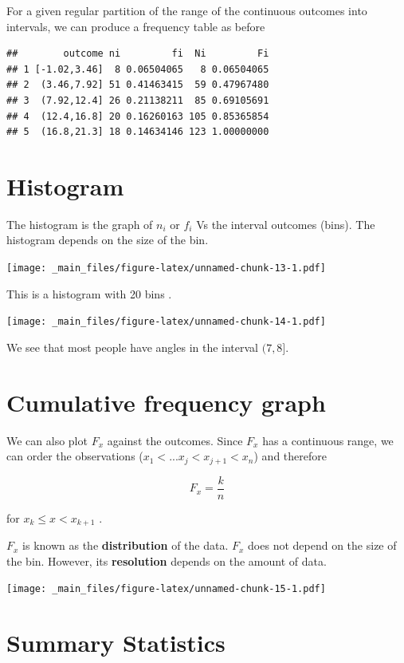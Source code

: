 \documentclass[
]{book}
\begin{document}
For a given regular partition of the range of the continuous outcomes into intervals, we can produce a frequency table as before

\begin{verbatim}
##        outcome ni         fi  Ni         Fi
## 1 [-1.02,3.46]  8 0.06504065   8 0.06504065
## 2  (3.46,7.92] 51 0.41463415  59 0.47967480
## 3  (7.92,12.4] 26 0.21138211  85 0.69105691
## 4  (12.4,16.8] 20 0.16260163 105 0.85365854
## 5  (16.8,21.3] 18 0.14634146 123 1.00000000
\end{verbatim}

\hypertarget{histogram}{%
\section{Histogram}\label{histogram}}

The histogram is the graph of \(n_i\) or \(f_i\) Vs the interval outcomes (bins). The histogram depends on the size of the bin.

\texttt{[image: \_main\_files/figure-latex/unnamed-chunk-13-1.pdf]}

This is a histogram with 20 bins .

\texttt{[image: \_main\_files/figure-latex/unnamed-chunk-14-1.pdf]}

We see that most people have angles in the interval \((7, 8]\).

\hypertarget{cumulative-frequency-graph-1}{%
\section{Cumulative frequency graph}\label{cumulative-frequency-graph-1}}

We can also plot \(F_x\) against the outcomes. Since \(F_x\) has a continuous range, we can order the observations (\(x_1 <... x_j < x_{j+1} < x_n\)) and therefore

\[F_x = \frac{k}{ n}\]

for \(x_{k} \leq x < x_{k+ 1}\) .

\(F_x\) is known as the \textbf{distribution} of the data. \(F_x\) does not depend on the size of the bin. However, its \textbf{resolution} depends on the amount of data.

\texttt{[image: \_main\_files/figure-latex/unnamed-chunk-15-1.pdf]}

\hypertarget{summary-statistics}{%
\section{Summary Statistics}\label{summary-statistics}}
\end{document}
